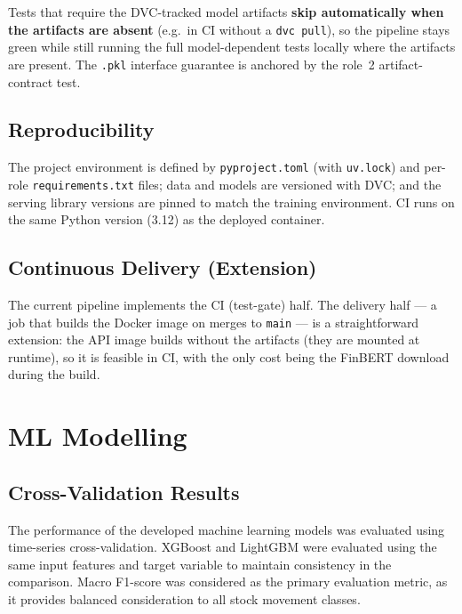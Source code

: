 \documentclass[11pt,a4paper]{article}
\begin{document}
Tests that require the DVC-tracked model artifacts \textbf{skip automatically
when the artifacts are absent} (e.g.\ in CI without a \texttt{dvc pull}), so the
pipeline stays green while still running the full model-dependent tests locally
where the artifacts are present. The \texttt{.pkl} interface guarantee is
anchored by the role~2 artifact-contract test.

\subsection{Reproducibility}

The project environment is defined by \texttt{pyproject.toml} (with
\texttt{uv.lock}) and per-role \texttt{requirements.txt} files; data and models
are versioned with DVC; and the serving library versions are pinned to match the
training environment. CI runs on the same Python version (3.12) as the deployed
container.

\subsection{Continuous Delivery (Extension)}

The current pipeline implements the CI (test-gate) half. The delivery half --- a
job that builds the Docker image on merges to \texttt{main} --- is a
straightforward extension: the API image builds without the artifacts (they are
mounted at runtime), so it is feasible in CI, with the only cost being the
FinBERT download during the build.



\section{ML Modelling}


\subsection{Cross-Validation Results}

The performance of the developed machine learning models was evaluated using
time-series cross-validation. XGBoost and LightGBM were evaluated using the
same input features and target variable to maintain consistency in the
comparison. Macro F1-score was considered as the primary evaluation metric,
as it provides balanced consideration to all stock movement classes.
\end{document}
